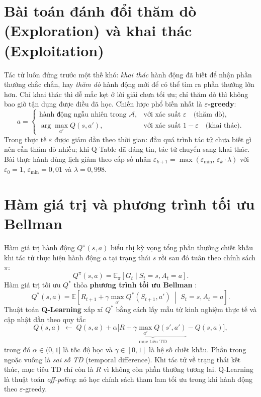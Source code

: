 \section{Bài toán đánh đổi thăm dò (Exploration) và khai thác (Exploitation)}
Tác tử luôn đứng trước một thế khó: \emph{khai thác} hành động đã biết để nhận phần thưởng chắc chắn, hay \emph{thăm dò}
hành động mới để có thể tìm ra phần thưởng lớn hơn. Chỉ khai thác thì dễ mắc kẹt ở lời giải chưa tối ưu; chỉ thăm dò thì
không bao giờ tận dụng được điều đã học. Chiến lược phổ biến nhất là \textbf{$\varepsilon$-greedy}:
\[
  a =
  \begin{cases}
    \text{hành động ngẫu nhiên trong } \mathcal{A}, & \text{với xác suất } \varepsilon \quad \text{(thăm dò)},\\[2pt]
    \arg\max_{a'} Q(s, a'), & \text{với xác suất } 1-\varepsilon \quad \text{(khai thác)}.
  \end{cases}
\]
Trong thực tế $\varepsilon$ được giảm dần theo thời gian: đầu quá trình tác tử chưa biết gì nên cần thăm dò nhiều; khi
Q-Table đã đáng tin, tác tử chuyển sang khai thác. Bài thực hành dùng lịch giảm theo cấp số nhân
$\varepsilon_{k+1} = \max(\varepsilon_{\min},\, \varepsilon_k \cdot \lambda)$ với $\varepsilon_0 = 1$,
$\varepsilon_{\min} = 0{,}01$ và $\lambda = 0{,}998$.


\section{Hàm giá trị và phương trình tối ưu Bellman}
Hàm giá trị hành động $Q^\pi(s, a)$ biểu thị kỳ vọng tổng phần thưởng chiết khấu khi tác tử thực hiện hành động $a$ tại
trạng thái $s$ rồi sau đó tuân theo chính sách $\pi$:
\[
  Q^\pi(s,a) = \mathbb{E}_\pi\!\left[ G_t \mid S_t = s, A_t = a \right].
\]
Hàm giá trị tối ưu $Q^*$ thỏa \textbf{phương trình tối ưu Bellman} \cite{sutton_barto}:
\[
  Q^*(s,a) = \mathbb{E}\!\left[ R_{t+1} + \gamma \max_{a'} Q^*(S_{t+1}, a') \;\middle|\; S_t = s, A_t = a \right].
\]
Thuật toán \textbf{Q-Learning} xấp xỉ $Q^*$ bằng cách lấy mẫu từ kinh nghiệm thực tế và cập nhật dần theo quy tắc
\[
  Q(s,a) \;\leftarrow\; Q(s,a) + \alpha \Big[ \underbrace{R + \gamma \max_{a'} Q(s', a')}_{\text{mục tiêu TD}} - Q(s,a)
  \Big],
\]
trong đó $\alpha \in (0,1]$ là tốc độ học và $\gamma \in [0,1]$ là hệ số chiết khấu. Phần trong ngoặc vuông là \emph{sai
số TD} (temporal difference). Khi tác tử về trạng thái kết thúc, mục tiêu TD chỉ còn là $R$ vì không còn phần thưởng
tương lai. Q-Learning là thuật toán \emph{off-policy}: nó học chính sách tham lam tối ưu trong khi hành động theo
$\varepsilon$-greedy.


